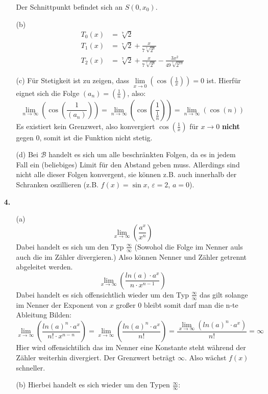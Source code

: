 \documentclass[a4paper,11pt,fleqn]{scrartcl}
\newcommand{\bra}[1]{\left(#1\right)}
\newcommand{\limxn}[2]{\lim\limits_{x \rightarrow #1}\bra{#2}}
\newcommand{\limn}[1]{\lim\limits_{n \rightarrow \infty}\bra{#1}}
\newcommand{\limx}[1]{\lim\limits_{x \rightarrow \infty}\bra{#1}}
\begin{document}
\begin{enumerate}
\begin{enumerate}
                Der Schnittpunkt befindet sich an $S(0, x_0)$.

            \item[(b)]
                \[\begin{array}{ll}
                    T_0(x) &= \sqrt[7]{2} \\[0.5em]
                    T_1(x) &= \sqrt[7]{2} + \frac{x}{7 \sqrt[7]{2^6}} \\[0.5em]
                    T_2(x) &= \sqrt[7]{2} + \frac{x}{7 \sqrt[7]{2^6}} - \frac{3x^2}{49 \sqrt[7]{2^{13}} }
                \end{array}\]

            \item[(c)]
                Für Stetigkeit ist zu zeigen, dass $\limxn{0}{\cos\bra{\frac{1}{x}}} = 0$
                ist. Hierfür eignet sich die Folge $(a_n) = (\frac{1}{n})$, also:
                \[ \limn{\cos\bra{\frac{1}{(a_n)}}} =
                \limn{\cos\bra{\frac{1}{\frac{1}{n}}}} =
                \limn{\cos\bra{n}} \]
                Es existiert kein Grenzwert, also konvergiert $\cos\bra{\frac{1}{x}}$
                für $x \rightarrow 0$ \textbf{nicht} gegen $0$, somit ist die
                Funktion nicht stetig.

            \item[(d)]
                Bei $\mathcal{B}$ handelt es sich um alle beschränkten Folgen, da
                es in jedem Fall ein (beliebiges) Limit für den Abstand geben
                muss. Allerdings sind nicht alle dieser Folgen konvergent, sie
                können z.B. auch innerhalb der Schranken oszillieren (z.B.
                $f(x) = \sin x$, $\varepsilon = 2$, $a = 0$).

        \end{enumerate}
    \item[\textbf{4.}]
        \begin{enumerate}
            \item[(a)]
                \[ \limx{ \frac{a^x}{x^n} }\] Dabei handelt es sich um den Typ $\frac{\infty}{\infty}$ (Sowohol die Folge im Nenner auls auch die im Zähler divergieren.)
                Also können Nenner und Zähler getrennt abgeleitet werden.
                \[\limx{\frac{ln(a) \cdot a^x}{n \cdot x^{n-1}}}\] Dabei handelt es sich offensichtlich wieder um den Typ $\frac{\infty}{\infty}$ das gilt solange im Nenner der Exponent von $x$ großer 0 bleibt somit darf man die n-te Ableitung Bilden:
                \[\limx{\frac{ln(a)^n \cdot a^x}{n! \cdot x^{n-n}}} = \limx{\frac{ln(a)^n \cdot a^x}{n!}} = \frac{\limx{ln(a)^n \cdot a^x}}{n!} = \infty\]
                Hier wird offensichtilich das im Nenner eine Konstante steht während der Zähler weiterhin divergiert. Der Grenzwert beträgt $\infty$. Also wächst $f(x)$ schneller.
            \item[(b)]
                Hierbei handelt es sich wieder um den Typen $\frac{\infty}{\infty}$:


\end{enumerate}
\end{enumerate}
\end{document}
